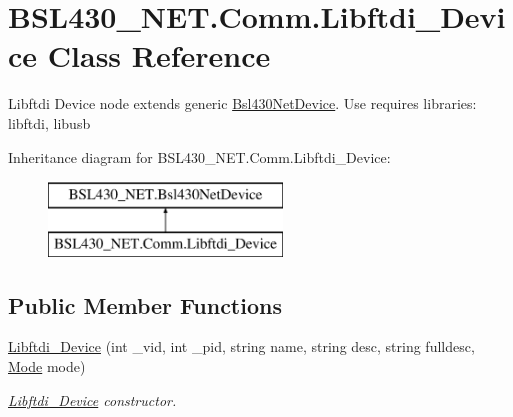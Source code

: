 \hypertarget{class_b_s_l430___n_e_t_1_1_comm_1_1_libftdi___device}{}\section{B\+S\+L430\+\_\+\+N\+E\+T.\+Comm.\+Libftdi\+\_\+\+Device Class Reference}
\label{class_b_s_l430___n_e_t_1_1_comm_1_1_libftdi___device}


Libftdi Device node extends generic \mbox{\hyperlink{class_b_s_l430___n_e_t_1_1_bsl430_net_device}{Bsl430\+Net\+Device}}. Use requires libraries\+: libftdi, libusb  


Inheritance diagram for B\+S\+L430\+\_\+\+N\+E\+T.\+Comm.\+Libftdi\+\_\+\+Device\+:\begin{figure}[H]
\begin{center}
\leavevmode
\includegraphics[height=2.000000cm]{class_b_s_l430___n_e_t_1_1_comm_1_1_libftdi___device}
\end{center}
\end{figure}
\subsection*{Public Member Functions}
\begin{DoxyCompactItemize}
\item 
\mbox{\hyperlink{class_b_s_l430___n_e_t_1_1_comm_1_1_libftdi___device_a8ea266a0b14a05f22bef5f817b6f5c45}{Libftdi\+\_\+\+Device}} (int \+\_\+vid, int \+\_\+pid, string name, string desc, string fulldesc, \mbox{\hyperlink{namespace_b_s_l430___n_e_t_aa1c6981cb6f279b5491d861ca555a1d7}{Mode}} mode)
\begin{DoxyCompactList}\small\item\em \mbox{\hyperlink{class_b_s_l430___n_e_t_1_1_comm_1_1_libftdi___device}{Libftdi\+\_\+\+Device}} constructor. \end{DoxyCompactList}\end{DoxyCompactItemize}
